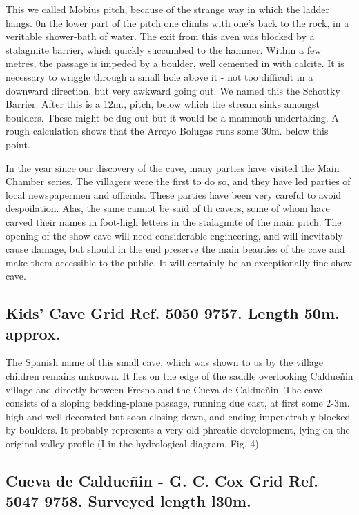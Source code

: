 \documentclass[11pt, a4paper, twoside]{memoir}
\begin{document}
This we called Mobius pitch, because of the strange way in which the ladder hangs. 0n the lower part of the pitch one climbs with one's back to the rock, in a veritable shower-bath of water. The exit from this aven was blocked by a stalagmite barrier, which quickly succumbed to the hammer. Within a few metres, the passage is impeded by a boulder, well cemented in with calcite. It is necessary to wriggle through a small hole above it - not too difficult in a downward direction, but very awkward going out. We named this the Schottky Barrier. After this is a 12m., pitch, below which the stream sinks amongst boulders. These might be dug out but it would be a mammoth undertaking. A rough calculation shows that the Arroyo Bolugas runs some 30m. below this point.

In the year since our discovery of the cave, many parties have visited the Main Chamber series. The villagers were the first to do so, and they have led parties of local newspapermen and officials. These parties have been very careful to avoid despoilation. Alas, the same cannot be said of th cavers, some of whom have carved their names in foot-high letters in the stalagmite of the main pitch. The opening of the show cave will need considerable engineering, and will inevitably cause damage, but should in the end preserve the main beauties of the cave and make them accessible to the public. It will certainly be an exceptionally fine show cave.




\subsection*{Kids' Cave Grid Ref. 5050 9757. Length 50m. approx.}

The Spanish name of this small cave, which was shown to us by the village children remains unknown. It lies on the edge of the saddle overlooking Caldueñin village and directly between Fresno and the Cueva de Caldueñin. The cave consists of a sloping bedding-plane passage, running due east, at first some 2-3m. high and well decorated but soon closing down, and ending impenetrably blocked by boulders. It probably represents a very old phreatic development, lying on the original valley profile (I in the hydrological diagram, Fig. 4).


\subsection*{Cueva de Caldueñin - G. C. Cox Grid Ref. 5047 9758. Surveyed length l30m.}
\end{document}
